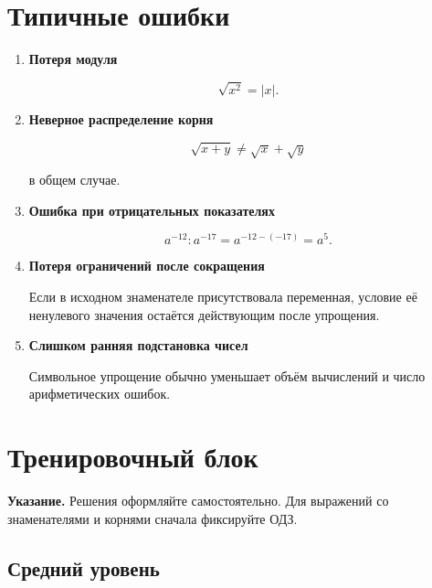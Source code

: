 \documentclass[a4paper,12pt]{article}
\begin{document}

\section{Типичные ошибки}

\begin{enumerate}

\item
\textbf{Потеря модуля}

\[
\sqrt{x^2}=|x|.
\]

\item
\textbf{Неверное распределение корня}

\[
\sqrt{x+y}\ne\sqrt{x}+\sqrt{y}
\]

в общем случае.

\item
\textbf{Ошибка при отрицательных показателях}

\[
a^{-12}:a^{-17}
=
a^{-12-(-17)}
=
a^5.
\]

\item
\textbf{Потеря ограничений после сокращения}

Если в исходном знаменателе присутствовала переменная,
условие её ненулевого значения остаётся действующим
после упрощения.

\item
\textbf{Слишком ранняя подстановка чисел}

Символьное упрощение обычно уменьшает объём вычислений
и число арифметических ошибок.

\end{enumerate}


\clearpage
\section*{Тренировочный блок}

\textbf{Указание.}
Решения оформляйте самостоятельно.
Для выражений со знаменателями и корнями
сначала фиксируйте ОДЗ.

\subsection*{Средний уровень}
\end{document}
